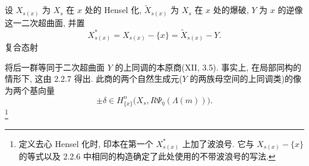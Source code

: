 设 $X_{s(x)}$ 为 $X_s$ 在 $x$ 处的 Hensel 化, $\widetilde X_{s(x)}$ 为 $X_s$ 在 $x$ 处的爆破, $Y$ 为 $x$ 的逆像这一二次超曲面, 并置
\[
X^*_{s(x)}=X_{s(x)}-\{x\}=\widetilde X_{s(x)}-Y.
\]
复合态射
\begin{center}
\end{center}
将后一群等同于二次超曲面 $Y$ 的上同调的本原商(XII, 3.5). 事实上, 在局部同构的情形下, 这由 2.2.7 得出. 此商的两个自然生成元($Y$ 的两族母空间的上同调类)的像为两个基向量
\[
\pm\delta\in
H^n_{\{x\}}\bigl(X_s,R\Psi_{\bar\eta}(\Lambda(m))\bigr).
\]
\footnote{定义去心 Hensel 化时, 印本在第一个 $X^*_{s(x)}$ 上加了波浪号. 它与 $X_{s(x)}-\{x\}$ 的等式以及 2.2.6 中相同的构造确定了此处使用的不带波浪号的写法.}